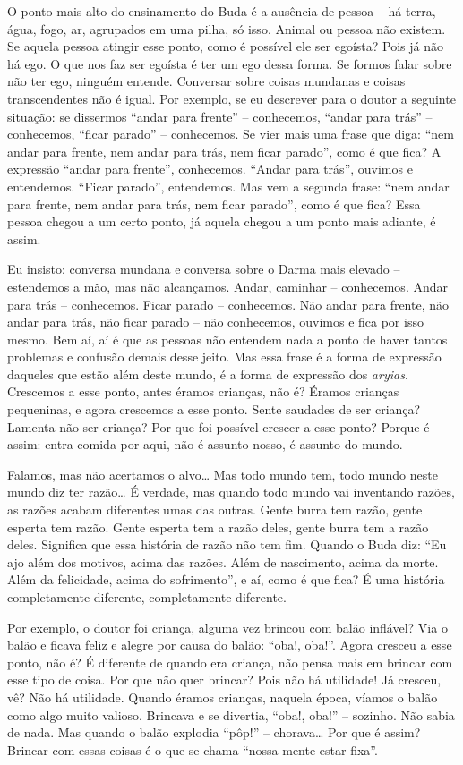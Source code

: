 O ponto mais alto do ensinamento do Buda é a ausência de pessoa – há
terra, água, fogo, ar, agrupados em uma pilha, só isso. Animal ou
pessoa não existem. Se aquela pessoa atingir esse ponto, como é
possível ele ser egoísta? Pois já não há ego. O que nos faz ser egoísta
é ter um ego dessa forma. Se formos falar sobre não ter ego, ninguém
entende. Conversar sobre coisas mundanas e coisas transcendentes não é
igual. Por exemplo, se eu descrever para o doutor a seguinte situação:
se dissermos “andar para frente” – conhecemos, “andar para trás” –
conhecemos, “ficar parado” – conhecemos. Se vier mais uma frase que
diga: “nem andar para frente, nem andar para trás, nem ficar parado”,
como é que fica? A expressão “andar para frente”, conhecemos. “Andar
para trás”, ouvimos e entendemos. “Ficar parado”, entendemos. Mas vem a
segunda frase: “nem andar para frente, nem andar para trás, nem ficar
parado”, como é que fica? Essa pessoa chegou a um certo ponto, já
aquela chegou a um ponto mais adiante, é assim.

Eu insisto: conversa mundana e conversa sobre o Darma mais elevado –
estendemos a mão, mas não alcançamos. Andar, caminhar – conhecemos.
Andar para trás – conhecemos. Ficar parado – conhecemos. Não andar para
frente, não andar para trás, não ficar parado – não conhecemos, ouvimos
e fica por isso mesmo. Bem aí, aí é que as pessoas não entendem nada a
ponto de haver tantos problemas e confusão demais desse jeito. Mas essa
frase é a forma de expressão daqueles que estão além deste mundo, é a
forma de expressão dos \textit{aryias}.
Crescemos a esse ponto, antes éramos crianças, não
é? Éramos crianças pequeninas, e agora crescemos a esse ponto. Sente
saudades de ser criança? Lamenta não ser criança? Por que foi possível
crescer a esse ponto? Porque é assim: entra comida por aqui, não é
assunto nosso, é assunto do mundo. 

Falamos, mas não acertamos o alvo… Mas todo mundo tem, todo mundo
neste mundo diz ter razão… É verdade, mas quando todo mundo vai
inventando razões, as razões acabam diferentes umas das outras. Gente
burra tem razão, gente esperta tem razão. Gente esperta tem a razão
deles, gente burra tem a razão deles. Significa que essa história de
razão não tem fim. Quando o Buda diz: “Eu ajo além dos motivos, acima
das razões. Além de nascimento, acima da morte. Além da felicidade,
acima do sofrimento”, e aí, como é que fica? É uma história
completamente diferente, completamente diferente. 

Por exemplo, o doutor foi criança, alguma vez brincou com balão
inflável? Via o balão e ficava feliz e alegre por causa do balão:
“oba!, oba!”. Agora cresceu a esse ponto, não é? É diferente de quando
era criança, não pensa mais em brincar com esse tipo de coisa. Por que
não quer brincar? Pois não há utilidade! Já cresceu, vê? Não há
utilidade. Quando éramos crianças, naquela época, víamos o balão como
algo muito valioso. Brincava e se divertia, “oba!, oba!” – sozinho. Não
sabia de nada. Mas quando o balão explodia “pôp!” – chorava… Por que é
assim? Brincar com essas coisas é o que se chama “nossa mente estar
fixa”. 

